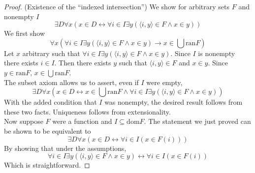 \documentclass{report}
\begin{document}
\newpage
\begin{proof}(Existence of the ``indexed intersection'')
We show for arbitrary sets $F$ and nonempty $I$
\begin{equation*}
\exists D\forall x(x\in D\leftrightarrow\forall i\in I\exists y(\langle i,y\rangle\in F\land x\in y))
\end{equation*}
We first show
\begin{equation*}
\forall x(\forall i\in I\exists y(\langle i,y\rangle\in F\land x\in y)\to x\in\bigcup\text{ran}F)
\end{equation*}
Let $x$ arbitrary such that $\forall i\in I\exists y(\langle i,y\rangle\in F\land x\in y)$. Since $I$ is nonempty there exists $i\in I$. Then there exists $y$ such that 
$\langle i,y\rangle\in F$ and $x\in y$. Since $y\in\text{ran}F$, $x\in\bigcup\text{ran}F$.\\
\indent The subset axiom allows us to assert, even if $I$ were empty,
\begin{equation*}
\exists D\forall x(x\in D\leftrightarrow x\in\bigcup\text{ran}F\land\forall i\in I\exists y(\langle i,y\rangle\in F\land x\in y))
\end{equation*}
With the added condition that $I$ was nonempty, the desired result follows from these two facts.
Uniqueness follows from extensionality.\\
\indent Now suppose $F$ were a function and $I\subseteq\text{dom}F$. The statement we just proved can be shown to be equivalent to
\begin{equation*}
\exists D\forall x(x\in D\leftrightarrow\forall i\in I(x\in F(i)))
\end{equation*}
By showing that under the assumptions, 
\begin{equation*}
\forall i\in I\exists y(\langle i,y\rangle\in F\land x\in y)\leftrightarrow\forall i\in I(x\in F(i))
\end{equation*}
Which is straightforward.
\end{proof}
\newpage
\end{document}
